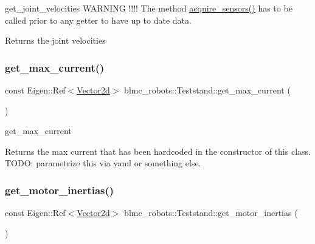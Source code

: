 get\+\_\+joint\+\_\+velocities W\+A\+R\+N\+I\+NG !!!! The method \hyperlink{classblmc__robots_1_1Teststand_a4203e25148ab5b4ddfef3b46647213c6}{acquire\+\_\+sensors()} has to be called prior to any getter to have up to date data. 

\begin{DoxyReturn}{Returns}
the joint velocities 
\end{DoxyReturn}
\mbox{\label{classblmc__robots_1_1Teststand_a2f912631ee055e3909ef1a5e06d8d27c}} 
\subsubsection{\texorpdfstring{get\+\_\+max\+\_\+current()}{get\_max\_current()}}
{\footnotesize\ttfamily const Eigen\+::\+Ref$<$\hyperlink{common__header_8hpp_acb6916bc8c9fe9d98c484fd4cc201447}{Vector2d}$>$ blmc\+\_\+robots\+::\+Teststand\+::get\+\_\+max\+\_\+current (\begin{DoxyParamCaption}{ }\end{DoxyParamCaption})\hspace{0.3cm}{\ttfamily [inline]}}



get\+\_\+max\+\_\+current 

\begin{DoxyReturn}{Returns}
the max current that has been hardcoded in the constructor of this class. T\+O\+DO\+: parametrize this via yaml or something else. 
\end{DoxyReturn}
\mbox{\label{classblmc__robots_1_1Teststand_a4897109730380ae0be7da37e2bd69e81}} 
\subsubsection{\texorpdfstring{get\+\_\+motor\+\_\+inertias()}{get\_motor\_inertias()}}
{\footnotesize\ttfamily const Eigen\+::\+Ref$<$\hyperlink{common__header_8hpp_acb6916bc8c9fe9d98c484fd4cc201447}{Vector2d}$>$ blmc\+\_\+robots\+::\+Teststand\+::get\+\_\+motor\+\_\+inertias (\begin{DoxyParamCaption}{ }\end{DoxyParamCaption})\hspace{0.3cm}{\ttfamily [inline]}}



